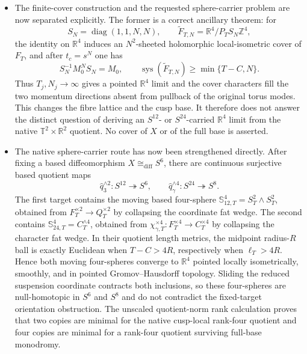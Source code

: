\begin{itemize}[leftmargin=1.8em]
\item The finite-cover construction and the requested sphere-carrier problem
are now separated explicitly.  The former is a correct ancillary theorem:
for
\[
 S_N=\operatorname{diag}(1,1,N,N),\qquad
 \widetilde F_{T,N}=\mathbb R^4/P_TS_N\mathbb Z^4,
\]
the identity on \(\mathbb R^4\) induces an \(N^2\)-sheeted holomorphic
local-isometric cover of \(F_T\), and after \(t_c=s^N\) one has
\[
 S_N^{-1}M_0^NS_N=M_0,
 \qquad
 \operatorname{sys}(\widetilde F_{T,N})\geq\min\{T-C,N\}.
\]
Thus \(T_j,N_j\to\infty\) gives a pointed \(\mathbb R^4\) limit and the
cover characters fill the two momentum directions absent from pullback of
the original torus modes.  This changes the fibre lattice and the cusp base.
It therefore does not answer the distinct question of deriving an
\(S^{12}\)- or \(S^{24}\)-carried \(\mathbb R^4\) limit from the native
\(\mathbb T^2\times\mathbb R^2\) quotient.  No cover of \(X\) or of the
full base is asserted.

\item The native sphere-carrier route has now been strengthened directly.
After fixing a based diffeomorphism \(X\cong_{\mathrm{diff}}S^6\), there
are continuous surjective based quotient maps
\[
 \widehat q_3^{\wedge2}:S^{12}\twoheadrightarrow S^6,
 \qquad
 \widehat q_\gamma^{\wedge4}:S^{24}\twoheadrightarrow S^8.
\]
The first target contains the moving based four-sphere
\(\mathbb S_{12,T}^4=S_T^2\wedge S_T^2\), obtained from
\(F_T^{\times2}\to Q_T^{\times2}\) by collapsing the coordinate fat
wedge.  The second contains
\(\mathbb S_{24,T}^4=C_T^{\wedge4}\), obtained from
\(\chi_{\gamma,T}^{\times4}:F_T^{\times4}\to C_T^{\times4}\) by
collapsing the character fat wedge.  In their quotient length metrics,
the midpoint radius-\(R\) ball is exactly Euclidean when
\(T-C>4R\), respectively when \(\ell_T>4R\).  Hence both moving
four-spheres converge to \(\mathbb R^4\) pointed locally isometrically,
smoothly, and in pointed Gromov--Hausdorff topology.  Sliding the reduced
suspension coordinate contracts both inclusions, so these four-spheres are
null-homotopic in \(S^6\) and \(S^8\) and do not contradict the fixed-target
orientation obstruction.  The unscaled quotient-norm rank calculation proves
that two copies are minimal for the native cusp-local rank-four quotient and
four copies are minimal for a rank-four quotient surviving full-base
monodromy.


\end{itemize}
